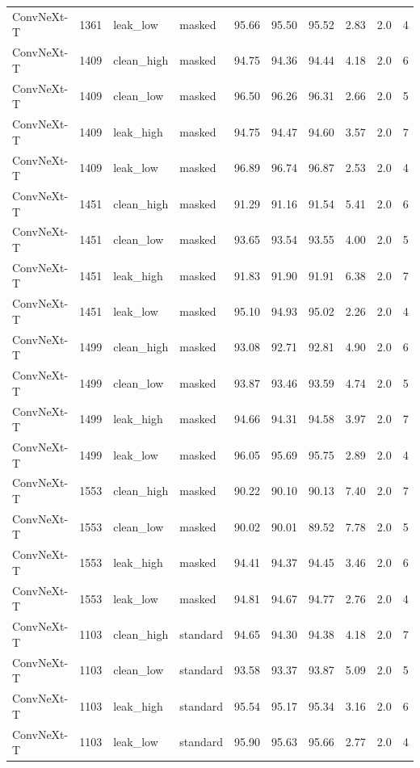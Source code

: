 {\begin{longtable}{lrllrrrrrr}
ConvNeXt-T & 1361 & leak\_low & masked & 95.66 & 95.50 & 95.52 & 2.83 & 2.0 & 4 \\
ConvNeXt-T & 1409 & clean\_high & masked & 94.75 & 94.36 & 94.44 & 4.18 & 2.0 & 6 \\
ConvNeXt-T & 1409 & clean\_low & masked & 96.50 & 96.26 & 96.31 & 2.66 & 2.0 & 5 \\
ConvNeXt-T & 1409 & leak\_high & masked & 94.75 & 94.47 & 94.60 & 3.57 & 2.0 & 7 \\
ConvNeXt-T & 1409 & leak\_low & masked & 96.89 & 96.74 & 96.87 & 2.53 & 2.0 & 4 \\
ConvNeXt-T & 1451 & clean\_high & masked & 91.29 & 91.16 & 91.54 & 5.41 & 2.0 & 6 \\
ConvNeXt-T & 1451 & clean\_low & masked & 93.65 & 93.54 & 93.55 & 4.00 & 2.0 & 5 \\
ConvNeXt-T & 1451 & leak\_high & masked & 91.83 & 91.90 & 91.91 & 6.38 & 2.0 & 7 \\
ConvNeXt-T & 1451 & leak\_low & masked & 95.10 & 94.93 & 95.02 & 2.26 & 2.0 & 4 \\
ConvNeXt-T & 1499 & clean\_high & masked & 93.08 & 92.71 & 92.81 & 4.90 & 2.0 & 6 \\
ConvNeXt-T & 1499 & clean\_low & masked & 93.87 & 93.46 & 93.59 & 4.74 & 2.0 & 5 \\
ConvNeXt-T & 1499 & leak\_high & masked & 94.66 & 94.31 & 94.58 & 3.97 & 2.0 & 7 \\
ConvNeXt-T & 1499 & leak\_low & masked & 96.05 & 95.69 & 95.75 & 2.89 & 2.0 & 4 \\
ConvNeXt-T & 1553 & clean\_high & masked & 90.22 & 90.10 & 90.13 & 7.40 & 2.0 & 7 \\
ConvNeXt-T & 1553 & clean\_low & masked & 90.02 & 90.01 & 89.52 & 7.78 & 2.0 & 5 \\
ConvNeXt-T & 1553 & leak\_high & masked & 94.41 & 94.37 & 94.45 & 3.46 & 2.0 & 6 \\
ConvNeXt-T & 1553 & leak\_low & masked & 94.81 & 94.67 & 94.77 & 2.76 & 2.0 & 4 \\
ConvNeXt-T & 1103 & clean\_high & standard & 94.65 & 94.30 & 94.38 & 4.18 & 2.0 & 7 \\
ConvNeXt-T & 1103 & clean\_low & standard & 93.58 & 93.37 & 93.87 & 5.09 & 2.0 & 5 \\
ConvNeXt-T & 1103 & leak\_high & standard & 95.54 & 95.17 & 95.34 & 3.16 & 2.0 & 6 \\
ConvNeXt-T & 1103 & leak\_low & standard & 95.90 & 95.63 & 95.66 & 2.77 & 2.0 & 4 \\

\end{longtable}}
